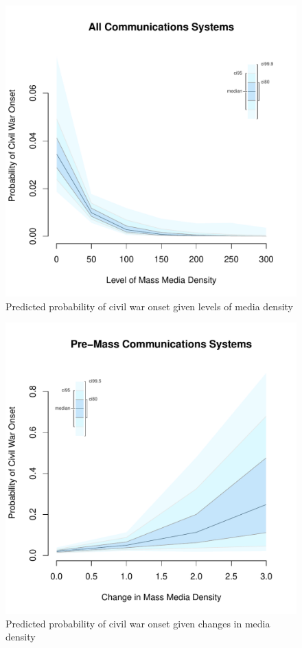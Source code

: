 \documentclass[12pt,article,oneside]{memoir}
\makeatletter
\def\maxwidth{\ifdim\Gin@nat@width>\linewidth\linewidth
\else\Gin@nat@width\fi}
\let\Oldincludegraphics\includegraphics
\renewcommand{\includegraphics}[1]{\Oldincludegraphics[width=\maxwidth]{#1}}
\makeatother
\begin{document}
\clearpage

\begin{figure} 
\includegraphics{figure/mdi_effect.pdf} 
\caption{Predicted probability of civil war onset given levels of media density} 
\label{myFigur} 
\end{figure}

\clearpage

\begin{figure} 
\includegraphics{figure/d_mdi_effect.pdf} 
\caption{Predicted probability of civil war onset given changes in media density} 
\label{myFigz} 
\end{figure}
\end{document}

